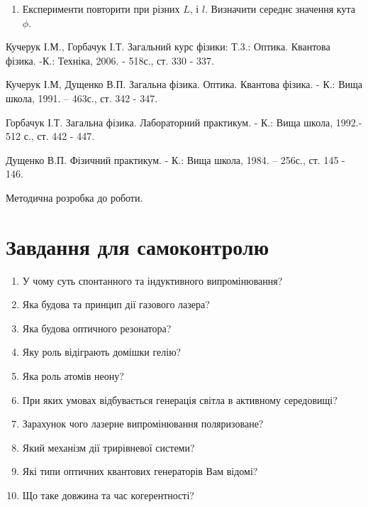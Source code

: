 \documentclass[twocolumn]{el-author}
\begin{document}
\begin{enumerate}
\begin{figure}[h]
\caption{\source{}}
\label{img:4}
\end{figure}

	\item Експерименти повторити при різних $L$, і $l$. Визначити середнє
значення кута $\phi$.
\end{enumerate}

\newpage
\begin{thebibliography}{}

Кучерук І.М., Горбачук І.Т. Загальний курс фізики: Т.3.: Оптика.
Квантова фізика. -К.: Техніка, 2006. - 518с., ст. 330 - 337.

Кучерук І.М, Дущенко В.П. Загальна фізика. Оптика. Квантова
фізика. - К.: Вища школа, 1991. -- 463с., ст. 342 - 347.

Горбачук І.Т. Загальна фізика. Лабораторний практикум. - К.:
Вища школа, 1992.- 512 с., ст. 442 - 447.

Дущенко В.П. Фізичний практикум. - К.: Вища школа, 1984. --
256с., ст. 145 - 146.

Методична розробка до роботи.

\end{thebibliography}

\section{Завдання для самоконтролю}

\begin{enumerate}
	\item У чому суть спонтанного та індуктивного випромінювання?
	\item Яка будова та принцип дії газового лазера?
	\item Яка будова оптичного резонатора?
	\item Яку роль відіграють домішки гелію?
	\item Яка роль атомів неону?
	\item При яких умовах відбувається генерація світла в активному
середовищі?
	\item Зарахунок чого лазерне випромінювання поляризоване?
	\item Який механізм дії трирівневої системи?
	\item Які типи оптичних квантових генераторів Вам відомі?
	\item Що таке довжина та час когерентності?
\end{enumerate}
\end{document}
